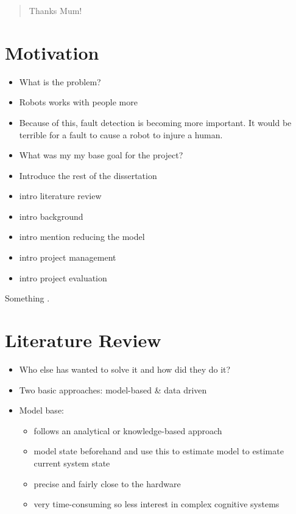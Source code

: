 \documentclass[11pt, a4paper]{report}
\begin{document}
\renewcommand{\abstractname}{Acknowledgements}
\begin{abstract}
  Thanks Mum!
\end{abstract}

\chapter{Motivation}
\label{cha:motivation}

\begin{itemize}
\item What is the problem?
\item Robots works with people more
\item Because of this, fault detection is becoming more important. It
  would be terrible for a fault to cause a robot to injure a human.
\item What was my my base goal for the project?
\item Introduce the rest of the dissertation
\item intro literature review
\item intro background
\item intro mention reducing the model
\item intro project management
\item intro project evaluation
\end{itemize}

Something \cite{Antonelo2008}.
\chapter{Literature Review}
\label{cha:lit-review}

\begin{itemize}
\item Who else has wanted to solve it and how did they do it?
\item Two basic approaches: model-based \& data driven
\item Model base:
  \begin{itemize}
  \item follows an analytical or knowledge-based approach
  \item model state beforehand and use this to estimate model to
    estimate current system state
  \item precise and fairly close to the hardware
  \item very time-consuming so less interest in complex cognitive
    systems
  \end{itemize}
\end{itemize}
\end{document}
